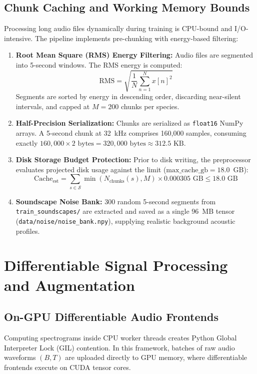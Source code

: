 \documentclass[11pt,a4paper]{article}
\begin{document}
\subsection{Chunk Caching and Working Memory Bounds}
Processing long audio files dynamically during training is CPU-bound and I/O-intensive. The pipeline implements pre-chunking with energy-based filtering:
\begin{enumerate}[leftmargin=*]
    \item \textbf{Root Mean Square (RMS) Energy Filtering:} Audio files are segmented into 5-second windows. The RMS energy is computed:
    \begin{equation}
        \text{RMS} = \sqrt{\frac{1}{N} \sum_{n=1}^N x[n]^2}
    \end{equation}
    Segments are sorted by energy in descending order, discarding near-silent intervals, and capped at $M = 200$ chunks per species.
    \item \textbf{Half-Precision Serialization:} Chunks are serialized as \texttt{float16} NumPy arrays. A 5-second chunk at 32~kHz comprises 160,000 samples, consuming exactly $160{,}000 \times 2 \text{ bytes} = 320{,}000 \text{ bytes} \approx 312.5 \text{ KB}$.
    \item \textbf{Disk Storage Budget Protection:} Prior to disk writing, the preprocessor evaluates projected disk usage against the limit ($\text{max\_cache\_gb} = 18.0$~GB):
    \begin{equation}
        \text{Cache}_{\text{est}} = \sum_{s \in \mathcal{S}} \min(N_{\text{chunks}}(s), M) \times 0.000305 \text{ GB} \le 18.0 \text{ GB}
    \end{equation}
    \item \textbf{Soundscape Noise Bank:} 300 random 5-second segments from \texttt{train\_soundscapes/} are extracted and saved as a single 96~MB tensor (\texttt{data/noise/noise\_bank.npy}), supplying realistic background acoustic profiles.
\end{enumerate}

\section{Differentiable Signal Processing and Augmentation}

\subsection{On-GPU Differentiable Audio Frontends}
Computing spectrograms inside CPU worker threads creates Python Global Interpreter Lock (GIL) contention. In this framework, batches of raw audio waveforms $(B, T)$ are uploaded directly to GPU memory, where differentiable frontends execute on CUDA tensor cores.
\end{document}
